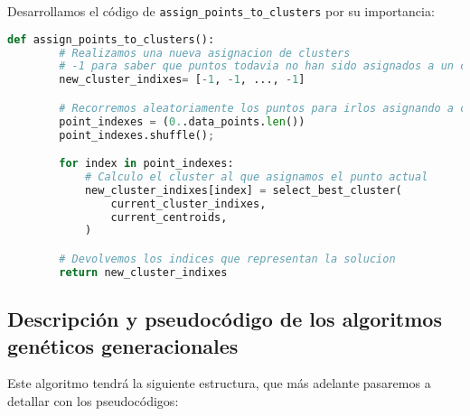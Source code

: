 \documentclass[11pt]{article}
\begin{document}
    Desarrollamos el código de \lstinline{assign_points_to_clusters} por su importancia:

    \begin{lstlisting}[language=Python, style=Boxed]
    def assign_points_to_clusters():
        # Realizamos una nueva asignacion de clusters
        # -1 para saber que puntos todavia no han sido asignados a un cluster
        new_cluster_indixes= [-1, -1, ..., -1]

        # Recorremos aleatoriamente los puntos para irlos asignando a cada cluster
        point_indexes = (0..data_points.len())
        point_indexes.shuffle();

        for index in point_indexes:
            # Calculo el cluster al que asignamos el punto actual
            new_cluster_indixes[index] = select_best_cluster(
                current_cluster_indixes,
                current_centroids,
            )

        # Devolvemos los indices que representan la solucion
        return new_cluster_indixes
    \end{lstlisting}

    \pagebreak

    \subsection{Descripción y pseudocódigo de los algoritmos genéticos generacionales}

    Este algoritmo tendrá la siguiente estructura, que más adelante pasaremos a detallar con los pseudocódigos:
\end{document}

